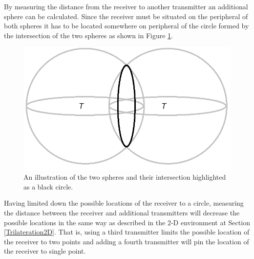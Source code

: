By measuring the distance from the receiver to another transmitter an additional sphere can be calculated. Since the receiver must be situated on the peripheral of both spheres it has to be located somewhere on peripheral of the circle formed by the intersection of the two spheres as shown in Figure \ref{fig_2spheres}.

\begin{figure}[H] 
  \centering
      \includegraphics[height=0.25\textwidth]{img/2Spheres}
  \caption{An illustration of the two spheres and their intersection highlighted as a black circle.}
  \label{fig_2spheres}
\end{figure}

Having limited down the possible locations of the receiver to a circle, measuring the distance between the receiver and additional transmitters will decrease the possible locations in the same way as described in the 2-D environment at Section \ref{Trilateration2D}. That is, using a third transmitter limits the possible location of the receiver to two points and adding a fourth transmitter will pin the location of the receiver to single point.



\clearpage